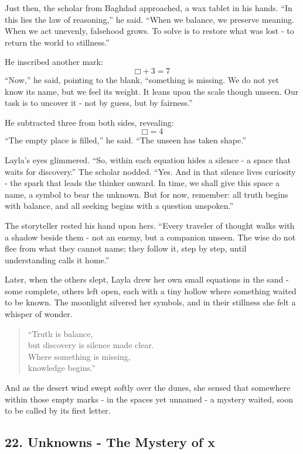 \documentclass[
  letterpaper,
  DIV=11,
  numbers=noendperiod]{scrreprt}
\begin{document}
Just then, the scholar from Baghdad approached, a wax tablet in his
hands. ``In this lies the law of reasoning,'' he said. ``When we
balance, we preserve meaning. When we act unevenly, falsehood grows. To
solve is to restore what was lost - to return the world to stillness.''

He inscribed another mark: \[
□ + 3 = 7
\] ``Now,'' he said, pointing to the blank, ``something is missing. We
do not yet know its name, but we feel its weight. It leans upon the
scale though unseen. Our task is to uncover it - not by guess, but by
fairness.''

He subtracted three from both sides, revealing: \[
□ = 4
\] ``The empty place is filled,'' he said. ``The unseen has taken
shape.''

Layla's eyes glimmered. ``So, within each equation hides a silence - a
space that waits for discovery.'' The scholar nodded. ``Yes. And in that
silence lives curiosity - the spark that leads the thinker onward. In
time, we shall give this space a name, a symbol to bear the unknown. But
for now, remember: all truth begins with balance, and all seeking begins
with a question unspoken.''

The storyteller rested his hand upon hers. ``Every traveler of thought
walks with a shadow beside them - not an enemy, but a companion unseen.
The wise do not flee from what they cannot name; they follow it, step by
step, until understanding calls it home.''

Later, when the others slept, Layla drew her own small equations in the
sand - some complete, others left open, each with a tiny hollow where
something waited to be known. The moonlight silvered her symbols, and in
their stillness she felt a whisper of wonder.

\begin{quote}
``Truth is balance,\\
but discovery is silence made clear.\\
Where something is missing,\\
knowledge begins.''
\end{quote}

And as the desert wind swept softly over the dunes, she sensed that
somewhere within those empty marks - in the spaces yet unnamed - a
mystery waited, soon to be called by its first letter.

\subsection{22. Unknowns - The Mystery of
x}\label{unknowns---the-mystery-of-x}
\end{document}
